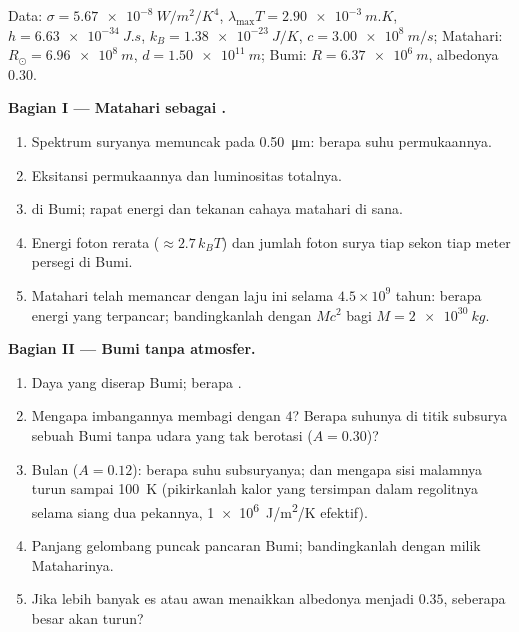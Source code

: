 \begin{problem}\label{pb:b2:thermal-radiation:1}
Data: $\sigma = \qty{5.67e-8}{W/m^2/K^4}$, $\lambda_{\max}T = \qty{2.90e-3}{m.K}$,
$h = \qty{6.63e-34}{J.s}$, $k_B = \qty{1.38e-23}{J/K}$, $c = \qty{3.00e8}{m/s}$;
Matahari: $R_\odot = \qty{6.96e8}{m}$, $d = \qty{1.50e11}{m}$; Bumi: $R =
\qty{6.37e6}{m}$, albedonya $0.30$.

\textbf{Bagian I --- Matahari sebagai .}
\begin{enumerate}
  \item Spektrum suryanya memuncak pada \qty{0.50}{\micro m}: berapa suhu
        permukaannya.
  \item Eksitansi permukaannya dan luminositas totalnya.
  \item {} di Bumi; rapat energi dan tekanan
        cahaya matahari di sana.
  \item Energi foton rerata ($\approx 2.7\,k_BT$) dan jumlah foton surya
        tiap sekon tiap meter persegi di Bumi.
  \item Matahari telah memancar dengan laju ini selama $4.5 \times 10^9$ tahun:
        berapa energi yang terpancar; bandingkanlah dengan $Mc^2$ bagi $M = \qty{2e30}{kg}$.
\end{enumerate}

\textbf{Bagian II --- Bumi tanpa atmosfer.}
\begin{enumerate}[resume]
  \item Daya yang diserap Bumi; berapa .
  \item Mengapa imbangannya membagi dengan $4$? Berapa suhunya
        di titik subsurya sebuah Bumi tanpa udara yang tak berotasi
        ($A = 0.30$)?
  \item Bulan ($A = 0.12$): berapa suhu subsuryanya; dan mengapa sisi
        malamnya turun sampai \qty{100}{K} (pikirkanlah kalor yang tersimpan dalam
        regolitnya selama siang dua pekannya, \qty{1e6}{J/m^2/K} efektif).
  \item Panjang gelombang puncak pancaran Bumi; bandingkanlah dengan
        milik Mataharinya.
  \item Jika lebih banyak es atau awan menaikkan albedonya menjadi $0.35$, seberapa besar
         akan turun?
\end{enumerate}


\end{problem}
